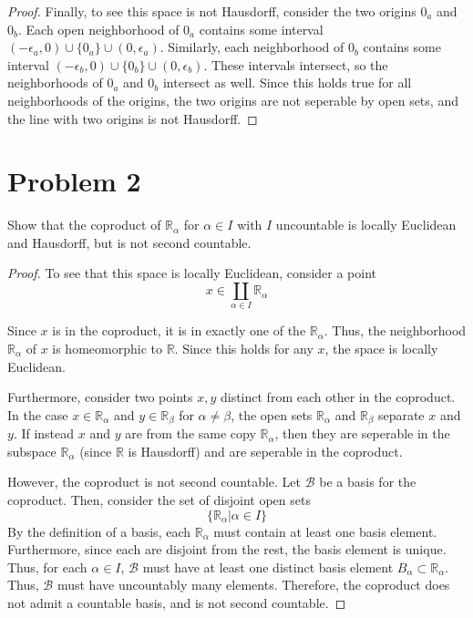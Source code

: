 \documentclass[fontsize=11pt]{scrartcl} %
\numberwithin{equation}{section} %
\numberwithin{figure}{section} %
\numberwithin{table}{section} %
\begin{document}
\begin{proof}
Finally, to see this space is not Hausdorff, consider the two origins $0_a$ and $0_b$.
Each open neighborhood of $0_a$ contains some interval
$(-\epsilon_a,0)\cup\{0_a\}\cup(0,\epsilon_a)$. Similarly, each neighborhood of $0_b$
contains some interval $(-\epsilon_b,0)\cup\{0_b\}\cup(0,\epsilon_b)$. These intervals
intersect, so the neighborhoods of $0_a$ and $0_b$ intersect as well.  Since this holds
true for all neighborhoods of the origins, the two origins are not seperable by open sets,
and the line with two origins is not Hausdorff.
\end{proof}




\section*{Problem 2}
Show that the coproduct of $\mathbb{R}_{\alpha}$ for $\alpha\in I$ with $I$ uncountable
is locally Euclidean and Hausdorff, but is not second countable.
\\
\begin{proof}
To see that this space is locally Euclidean, consider a point 
\[
x \in \coprod_{\alpha\in I}\mathbb{R}_{\alpha}
\]

Since $x$ is in the coproduct, it is in exactly one of the $\mathbb{R}_{\alpha}$.
Thus, the neighborhood $\mathbb{R}_{\alpha}$ of $x$ is homeomorphic to $\mathbb{R}$.
Since this holds for any $x$, the space is locally Euclidean.

Furthermore, consider two points $x,y$ distinct from each other in the coproduct.
In the case $x\in\mathbb{R}_{\alpha}$ and $y\in\mathbb{R}_{\beta}$ for $\alpha\neq\beta$,
the open sets $\mathbb{R}_{\alpha}$ and $\mathbb{R}_{\beta}$ separate $x$ and $y$.
If instead $x$ and $y$ are from the same copy $\mathbb{R}_{\alpha}$, then they are seperable
in the subspace $\mathbb{R}_{\alpha}$ (since $\mathbb{R}$ is Hausdorff) and are seperable
in the coproduct.

However, the coproduct is not second countable. Let $\mathscr{B}$ be a basis for the coproduct.
Then, consider the set of disjoint open sets
\[
    \{\mathbb{R}_\alpha | \alpha\in I\}
\]
By the definition of a basis, each $\mathbb{R}_{\alpha}$ must contain at least one basis
element. Furthermore, since each are disjoint from the rest, the basis element is unique.
Thus, for each $\alpha \in I$, $\mathscr{B}$ must have at least one distinct basis element
$B_{\alpha}\subset \mathbb{R}_{\alpha}$. Thus, $\mathscr{B}$ must have uncountably many
elements. Therefore, the coproduct does not admit a countable basis, and is not second
countable. 
\end{proof}
\end{document}
